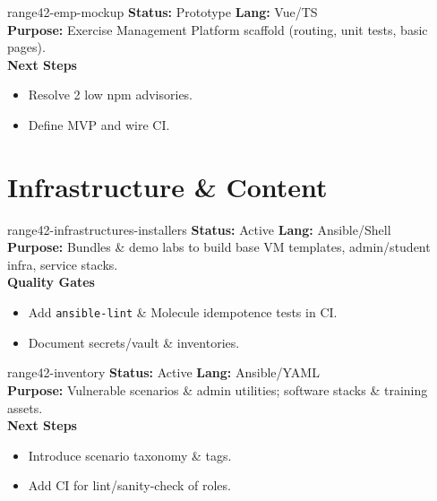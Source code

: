 \documentclass[aspectratio=169]{beamer}
\begin{document}
\begin{frame}{range42-emp-mockup \; \faChalkboardTeacher}
  \textbf{Status:} Prototype \hfill \textbf{Lang:} Vue/TS\\[2mm]
  \textbf{Purpose:} Exercise Management Platform scaffold (routing, unit tests, basic pages).\\[2mm]
  \textbf{Next Steps}
  \begin{itemize}
    \item Resolve 2 low npm advisories.
    \item Define MVP and wire CI.
  \end{itemize}
\end{frame}

\section{Infrastructure \& Content}

\begin{frame}{range42-infrastructures-installers \; \faCubes}
  \textbf{Status:} Active \hfill \textbf{Lang:} Ansible/Shell\\[2mm]
  \textbf{Purpose:} Bundles \& demo labs to build base VM templates, admin/student infra, service stacks.\\[2mm]
  \textbf{Quality Gates}
  \begin{itemize}
    \item Add \texttt{ansible-lint} \& Molecule idempotence tests in CI.
    \item Document secrets/vault \& inventories.
  \end{itemize}
\end{frame}

\begin{frame}{range42-inventory \; \faBoxes}
  \textbf{Status:} Active \hfill \textbf{Lang:} Ansible/YAML\\[2mm]
  \textbf{Purpose:} Vulnerable scenarios \& admin utilities; software stacks \& training assets.\\[2mm]
  \textbf{Next Steps}
  \begin{itemize}
    \item Introduce scenario taxonomy \& tags.
    \item Add CI for lint/sanity-check of roles.
  \end{itemize}
\end{frame}
\end{document}
